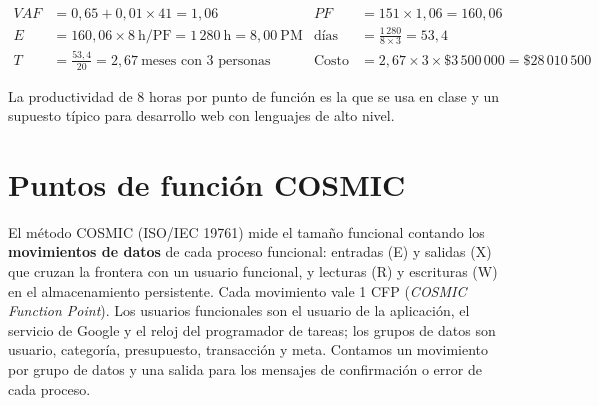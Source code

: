 \begin{align*}
VAF &= 0{,}65 + 0{,}01 \times 41 = 1{,}06 & PF &= 151 \times 1{,}06 = 160{,}06\\
E &= 160{,}06 \times 8\ \text{h/PF} = 1\,280\ \text{h} = 8{,}00\ \text{PM} & \text{días} &= \frac{1\,280}{8 \times 3} = 53{,}4\\
T &= \frac{53{,}4}{20} = 2{,}67\ \text{meses con 3 personas} & \text{Costo} &= 2{,}67 \times 3 \times \$3\,500\,000 = \$28\,010\,500
\end{align*}

La productividad de 8 horas por punto de función es la que se usa en clase y un supuesto típico para desarrollo web con lenguajes de alto nivel.

\section{Puntos de función COSMIC}

El método COSMIC (ISO/IEC 19761) mide el tamaño funcional contando los \textbf{movimientos de datos} de cada proceso funcional: entradas (E) y salidas (X) que cruzan la frontera con un usuario funcional, y lecturas (R) y escrituras (W) en el almacenamiento persistente. Cada movimiento vale 1 CFP (\emph{COSMIC Function Point}). Los usuarios funcionales son el usuario de la aplicación, el servicio de Google y el reloj del programador de tareas; los grupos de datos son usuario, categoría, presupuesto, transacción y meta. Contamos un movimiento por grupo de datos y una salida para los mensajes de confirmación o error de cada proceso.

